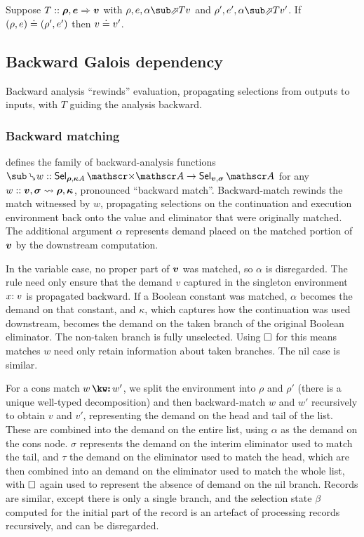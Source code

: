 \begin{lemma}
   Suppose $T :: \bm{\rho}, \bm{e} \Rightarrow \bm{v}$ with $\rho, e, \alpha \evalFwdR{T} v$ and $\rho', e', \alpha \evalFwdR{T} v'$. If $(\rho, e) \doteq (\rho', e')$ then $v \doteq v'$.
\end{lemma}

\subsection{Backward Galois dependency}
\label{sec:data-dependencies:analyses:bwd}

Backward analysis ``rewinds'' evaluation, propagating selections from outputs to inputs, with $T$ guiding the analysis backward.

\subsubsection{Backward matching}
\label{sec:data-dependencies:analyses:bwd:pattern-match}

 defines the family of backward-analysis functions $\matchBwdF{w} :: \Sel{\raw{\rho}, \raw{\kappa}{A}} \times \Ann{A} \to \Sel{\raw{v}, \raw{\sigma}}{A}$ for any $w :: \bm{v}, \bm{\sigma} \rightsquigarrow \bm{\rho}, \bm{\kappa}$, pronounced ``backward match''. Backward-match rewinds the match witnessed by $w$, propagating selections on the continuation and execution environment back onto the value and eliminator that were originally matched. The additional argument $\alpha$ represents demand placed on the matched portion of $\bm{v}$ by the downstream computation.

In the variable case, no proper part of $\bm{v}$ was matched, so $\alpha$ is disregarded. The rule need only ensure that the demand $v$ captured in the singleton environment $x{:}\;v$ is propagated backward. If a Boolean constant was matched, $\alpha$ becomes the demand on that constant, and $\kappa$, which captures how the continuation was used downstream, becomes the demand on the taken branch of the original Boolean eliminator. The non-taken branch is fully unselected. Using $\square$ for this means matches $w$ need only retain information about taken branches. The nil case is similar.

For a cons match $\matchCons{w}{w'}$, we split the environment into $\rho$ and $\rho'$ (there is a unique well-typed decomposition) and then backward-match $w$ and $w'$ recursively to obtain $v$ and $v'$, representing the demand on the head and tail of the list. These are combined into the demand on the entire list, using $\alpha$ as the demand on the cons node. $\sigma$ represents the demand on the interim eliminator used to match the tail, and $\tau$ the demand on the eliminator used to match the head, which are then combined into an demand on the eliminator used to match the whole list, with $\square$ again used to represent the absence of demand on the nil branch. Records are similar, except there is only a single branch, and the selection state $\beta$ computed for the initial part of the record is an artefact of processing records recursively, and can be disregarded.

